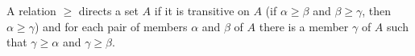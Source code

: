 A relation $\geq$ directs a set $A$ if it is transitive on $A$ (if $\alpha \geq \beta$ and $\beta \geq \gamma$, then $\alpha \geq \gamma$) and for each pair of members $\alpha$ and $\beta$ of $A$ there is a member $\gamma$ of $A$ such that $\gamma \geq \alpha$ and $\gamma \geq \beta$.
